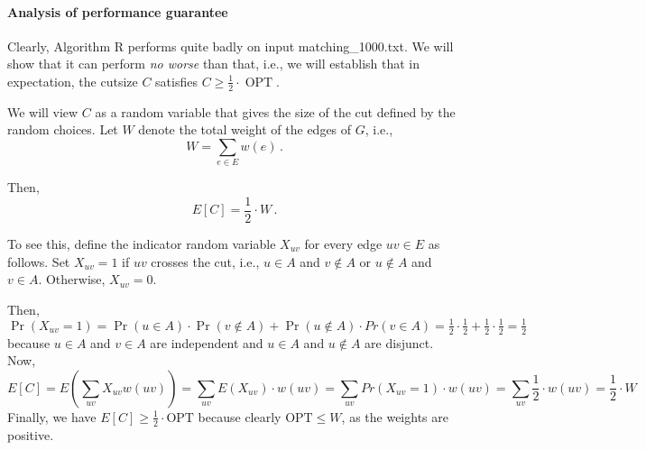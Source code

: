 \documentclass{tufte-handout}
\begin{document}
\begin{enumerate}
\noindent
{}
\end{enumerate}

\paragraph{Analysis of performance guarantee}

Clearly, Algorithm R performs quite badly on input 
  matching\_1000.txt.
We will show that it can perform \emph{no worse} than that, i.e., we
will establish that in expectation, the cutsize $C$ satisfies $C \geq
\frac{1}{2}\cdot \operatorname{OPT}$.


We will view $C$ as a random variable that gives the size of the cut
defined by the random choices.
Let $W$ denote the total weight of the edges of $G$, i.e.,
\[ W= \sum_{e\in E} w(e)\,.\]

Then,
\begin{equation}
E[C] = \textstyle\frac{1}{2}\cdot W\,.
\end{equation}

To see this, define the indicator random variable $X_{uv}$ for every
edge $uv\in E$ as follows.
Set $X_{uv}=1$ if $uv$ crosses the cut, i.e., $u\in A$ and $v\notin A$
or $u\notin A$ and $v\in A$.
Otherwise, $X_{uv} = 0$.

Then, $\Pr(X_{uv} = 1) = \Pr(u \in A) \cdot \Pr(v \notin A) + \Pr(u \notin A)
\cdot Pr(v \in A) = \frac{1}{2} \cdot \frac{1}{2} + \frac{1}{2} \cdot
\frac{1}{2} = \frac{1}{2}$ because $u \in A$ and $v \in A$ are independent and
$u \in A$ and $u \notin A$ are disjunct.  Now, \[ E[C]= E(\sum_{uv}
X_{uv}w(uv)) = \sum_{uv}E(X_{uv})\cdot{}w(uv) = \sum_{uv}Pr(X_{uv} =
1)\cdot{}w(uv) = \sum_{uv}\frac{1}{2}\cdot{}w(uv) = \frac{1}{2}\cdot{}W \]
Finally, we have \(E[C]\geq \frac{1}{2} \cdot \text{OPT}\) because clearly
$\text{OPT} \leq W$, as the weights are positive.
\end{document}
